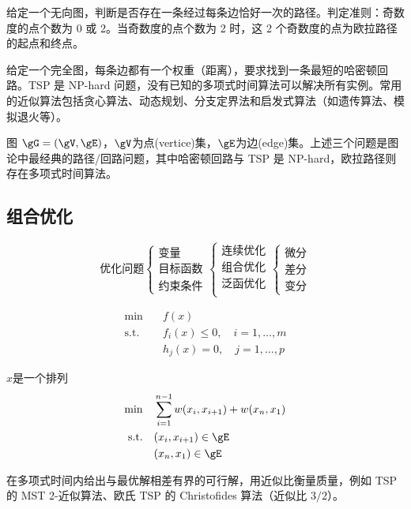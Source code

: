 \documentclass[12pt]{article}
\begin{document}
\begin{defn}[欧拉路径问题]
  给定一个无向图，判断是否存在一条经过每条边恰好一次的路径。判定准则：奇数度的点个数为 0 或 2。当奇数度的点个数为 2 时，这 2 个奇数度的点为欧拉路径的起点和终点。
\end{defn}

\begin{defn}[旅行商问题]
  给定一个完全图，每条边都有一个权重（距离），要求找到一条最短的哈密顿回路。TSP 是 NP-hard 问题，没有已知的多项式时间算法可以解决所有实例。常用的近似算法包括贪心算法、动态规划、分支定界法和启发式算法（如遗传算法、模拟退火等）。
\end{defn}
\begin{exam}
  图 $\gG=(\gV,\gE)$，$\gV$为点(vertice)集，$\gE$为边(edge)集。上述三个问题是图论中最经典的路径/回路问题，其中哈密顿回路与 TSP 是 NP-hard，欧拉路径则存在多项式时间算法。

\end{exam}
\subsection{组合优化}
\[
  \text{优化问题}\begin{cases}
    \text{变量}   \\
    \text{目标函数} \\
    \text{约束条件}
  \end{cases}\begin{cases}
    \text{连续优化} \\
    \text{组合优化} \\
    \text{泛函优化} \\
  \end{cases}\begin{cases}
    \text{微分} \\
    \text{差分} \\
    \text{变分}
  \end{cases}
\]
\begin{exam}
  \[
    \begin{aligned}
      \min\quad        & f(x)                           \\
      \text{s.t.}\quad & f_i(x)\le 0,\quad i=1,\ldots,m \\
                       & h_j(x)=0,\quad j=1,\ldots,p
    \end{aligned}
  \]
\end{exam}
\begin{exam}
  $x$是一个排列
  \[
    \begin{aligned}
      \min\quad        & \sum_{i=1}^{n-1}w(x_i,x_{i+1})+w(x_n,x_1) \\
      \text{s.t.}\quad & (x_i,x_{i+1})\in \gE                      \\
                       & (x_n,x_1)\in\gE
    \end{aligned}
  \]
\end{exam}
\begin{defn}
  在多项式时间内给出与最优解相差有界的可行解，用近似比衡量质量，例如 TSP 的 MST 2-近似算法、欧氏 TSP 的 Christofides 算法（近似比 $3/2$）。
\end{defn}
\end{document}
